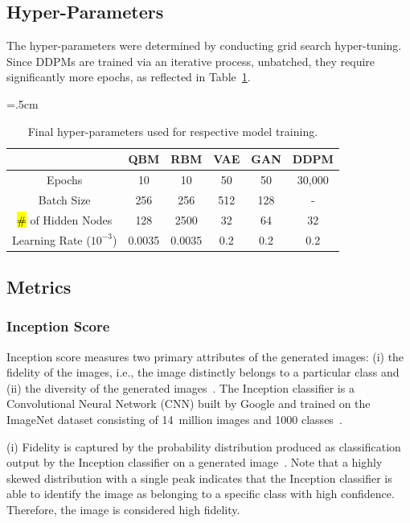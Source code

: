 \documentclass[technologies,article,accept,pdftex,moreauthors]{Definitions/mdpi}
\begin{document}
\subsection{Hyper-Parameters} 
The hyper-parameters were determined by conducting grid search hyper-tuning. Since DDPMs are trained via an iterative process, unbatched, they require significantly more epochs, as reflected in Table~\ref{tab:hyperparams}.

\begin{table}[H]
\caption{\label{tab:hyperparams}Final hyper-parameters used for respective model training.}
\tabcolsep=.5cm
\begin{tabular}{cccccc}
\toprule
& \textbf{QBM} & \textbf{RBM} & \textbf{VAE} & \textbf{GAN} & \textbf{DDPM}\\
\midrule
 Epochs & 10 & 10 & 50 & 50 & 30,000\\ 
 Batch Size & 256 & 256 & 512 & 128 & - \\ 
\hl{\#} %
 of Hidden Nodes & 128 & 2500 & 32 & 64 & 32 \\ 
 Learning Rate ($10^{-3}$) & 0.0035 & 0.0035 & 0.2 & 0.2 & 0.2\\
\bottomrule
\end{tabular}
\end{table}


\subsection{Metrics}
\label{metrics_}
\subsubsection{Inception Score}
Inception score measures two primary attributes of the generated images: (i) the fidelity of the images, i.e., the image distinctly belongs to a particular class and (ii) the diversity of the generated images~\cite{mack_2019}. The Inception classifier is a Convolutional Neural Network (CNN) built by Google and trained on the ImageNet dataset consisting of 14~million images and 1000 classes~\cite{inception_model}.


(i) Fidelity is captured by the probability distribution produced as classification output by the Inception classifier on a generated image~\cite{mack_2019}. Note that a highly skewed distribution with a single peak indicates that the Inception classifier is able to identify the image as belonging to a specific class with high confidence. Therefore, the image is considered high fidelity.
\end{document}
